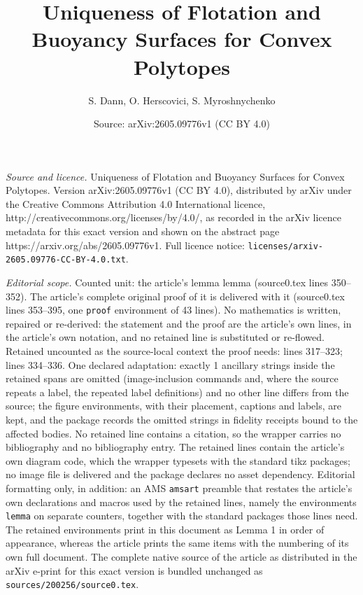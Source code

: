 \documentclass[10pt,a4paper]{amsart}
\title{Uniqueness of Flotation and Buoyancy Surfaces for Convex Polytopes}
\author{S. Dann, O. Herscovici, S. Myroshnychenko}
\date{Source: arXiv:2605.09776v1 (CC BY 4.0)}
\begin{document}
\maketitle

\noindent\emph{Source and licence.} Uniqueness of Flotation and Buoyancy Surfaces for Convex Polytopes. Version arXiv:2605.09776v1 (CC BY 4.0), distributed by arXiv under the Creative Commons Attribution 4.0 International licence, http://creativecommons.org/licenses/by/4.0/, as recorded in the arXiv licence metadata for this exact version and shown on the abstract page https://arxiv.org/abs/2605.09776v1. Full licence notice: \texttt{licenses/arxiv-2605.09776-CC-BY-4.0.txt}.\par\smallskip

\noindent\textit{Editorial scope.} Counted unit: the article's lemma lemma (source0.tex lines 350--352). The article's complete original proof of it is delivered with it (source0.tex lines 353--395, one \texttt{proof} environment of 43 lines). No mathematics is written, repaired or re-derived: the statement and the proof are the article's own lines, in the article's own notation, and no retained line is substituted or re-flowed.  Retained uncounted as the source-local context the proof needs: lines 317--323; lines 334--336.  One declared adaptation: exactly 1 ancillary strings inside the retained spans are omitted (image-inclusion commands and, where the source repeats a label, the repeated label definitions) and no other line differs from the source; the figure environments, with their placement, captions and labels, are kept, and the package records the omitted strings in fidelity receipts bound to the affected bodies.  No retained line contains a citation, so the wrapper carries no bibliography and no bibliography entry.  The retained lines contain the article's own diagram code, which the wrapper typesets with the standard tikz packages; no image file is delivered and the package declares no asset dependency.  Editorial formatting only, in addition: an AMS \texttt{amsart} preamble that restates the article's own declarations and macros used by the retained lines, namely the environments \texttt{lemma} on separate counters, together with the standard packages those lines need.  The retained environments print in this document as Lemma 1 in order of appearance, whereas the article prints the same items with the numbering of its own full document.  The complete native source of the article as distributed in the arXiv e-print for this exact version is bundled unchanged as \texttt{sources/200256/source0.tex}.
\end{document}
